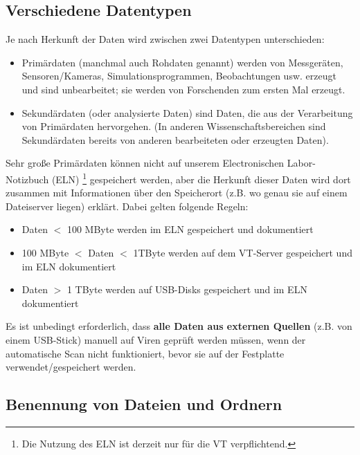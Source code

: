 \subsection{Verschiedene Datentypen}
Je nach Herkunft der Daten wird zwischen zwei Datentypen unterschieden:
\begin{itemize}
  \item Primärdaten (manchmal auch Rohdaten genannt) werden von Messgeräten,
        Sensoren/Kameras, Simulationsprogrammen, Beobachtungen usw. erzeugt
        und sind unbearbeitet; sie werden von Forschenden zum ersten Mal erzeugt.
  \item Sekundärdaten (oder analysierte Daten) sind Daten, die aus der
        Verarbeitung von Primärdaten hervorgehen. (In anderen
        Wissenschaftsbereichen sind Sekundärdaten bereits von anderen
        bearbeiteten oder erzeugten Daten).
\end{itemize}
Sehr große Primärdaten können nicht auf unserem Electronischen Labor-Notizbuch (ELN)%
  \footnote{%
    Die Nutzung des ELN ist derzeit nur für die VT verpflichtend.
  }%
gespeichert werden, aber die Herkunft dieser Daten wird dort zusammen mit
Informationen über den Speicherort (z.B. wo genau sie auf einem Dateiserver
liegen) erklärt. Dabei gelten folgende Regeln:
\begin{itemize}
  \item Daten $<$ 100 MByte werden im ELN gespeichert und dokumentiert
  \item 100 MByte $<$ Daten $<$ 1TByte werden auf dem VT-Server gespeichert und im
        ELN dokumentiert
  \item Daten $>$ 1 TByte werden auf USB-Disks gespeichert und im ELN dokumentiert
\end{itemize}
Es ist unbedingt erforderlich, dass \textbf{alle Daten aus externen Quellen} (z.B. von einem USB-Stick) manuell auf Viren geprüft werden müssen, wenn der automatische Scan nicht funktioniert, bevor sie auf der Festplatte verwendet/gespeichert werden.

\subsection{Benennung von Dateien und Ordnern }

